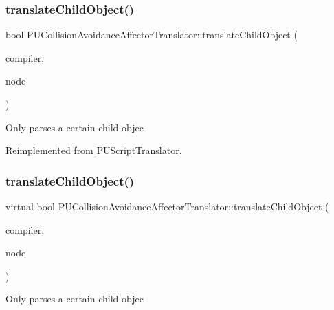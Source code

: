 \subsubsection{\texorpdfstring{translate\+Child\+Object()}{translateChildObject()}\hspace{0.1cm}{\footnotesize\ttfamily [1/2]}}
{\footnotesize\ttfamily bool P\+U\+Collision\+Avoidance\+Affector\+Translator\+::translate\+Child\+Object (\begin{DoxyParamCaption}\item[{\hyperlink{classPUScriptCompiler}{P\+U\+Script\+Compiler} $\ast$}]{compiler,  }\item[{\hyperlink{classPUAbstractNode}{P\+U\+Abstract\+Node} $\ast$}]{node }\end{DoxyParamCaption})\hspace{0.3cm}{\ttfamily [virtual]}}

Only parses a certain child objec 

Reimplemented from \hyperlink{classPUScriptTranslator_ab587d01348ae3e678cb700c719b2b113}{P\+U\+Script\+Translator}.

\mbox{\label{classPUCollisionAvoidanceAffectorTranslator_ab5295fab3a21dbffe2fd59a5fb2f787c}} 
\subsubsection{\texorpdfstring{translate\+Child\+Object()}{translateChildObject()}\hspace{0.1cm}{\footnotesize\ttfamily [2/2]}}
{\footnotesize\ttfamily virtual bool P\+U\+Collision\+Avoidance\+Affector\+Translator\+::translate\+Child\+Object (\begin{DoxyParamCaption}\item[{\hyperlink{classPUScriptCompiler}{P\+U\+Script\+Compiler} $\ast$}]{compiler,  }\item[{\hyperlink{classPUAbstractNode}{P\+U\+Abstract\+Node} $\ast$}]{node }\end{DoxyParamCaption})\hspace{0.3cm}{\ttfamily [virtual]}}

Only parses a certain child objec 

